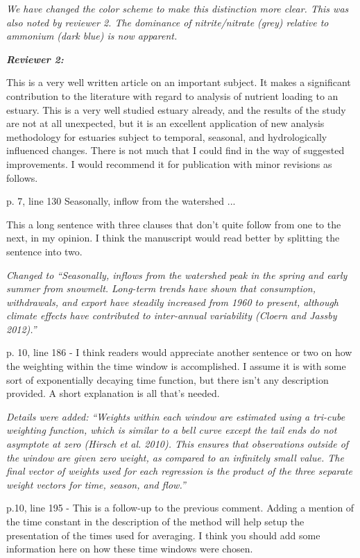 \documentclass[letterpaper,12pt]{article}
\newcommand{\Bigtxt}[1]{\textbf{\textit{#1}}}
\begin{document}
{\it We have changed the color scheme to make this distinction more clear.  This was also noted by reviewer 2.  The dominance of nitrite/nitrate (grey) relative to ammonium (dark blue) is now apparent.}


\Bigtxt{Reviewer 2:}

This is a very well written article on an important subject.  It makes a significant contribution to the literature with regard to analysis of nutrient loading to an estuary.  This is a very well studied estuary already, and the results of the study are not at all unexpected, but it is an excellent application of new analysis methodology for estuaries subject to temporal, seasonal, and hydrologically influenced changes.  There is not much that I could find in the way of suggested improvements.  I would recommend it for publication with minor revisions as follows.

p. 7, line 130   Seasonally, inflow from the watershed ...

This a long sentence with three clauses that don't quite follow from one to the next, in my opinion.  I think the manuscript would read better by splitting the sentence into two.

{\it Changed to ``Seasonally, inflows from the watershed peak in the spring and early summer from snowmelt.  Long-term trends have shown that consumption, withdrawals, and export have steadily increased from 1960 to present, although climate effects have contributed to inter-annual variability (Cloern and Jassby 2012).''}

p. 10, line 186 - I think readers would appreciate another sentence or two on how the weighting within the time window is accomplished.  I assume it is with some sort of exponentially decaying time function, but there isn't any description provided.  A short explanation is all that's needed.  

{\it Details were added: ``Weights within each window are estimated using a tri-cube weighting function, which is similar to a bell curve except the tail ends do not asymptote at zero (Hirsch et al. 2010).  This ensures that observations outside of the window are given zero weight, as compared to an infinitely small value.  The final vector of weights used for each regression is the product of the three separate weight vectors for time, season, and flow.''}

p.10, line 195 - This is a follow-up to the previous comment.  Adding a mention of the time constant in the description of the method will help setup the presentation of the times used for averaging.  I think you should add some information here on how these time windows were chosen.
\end{document}
